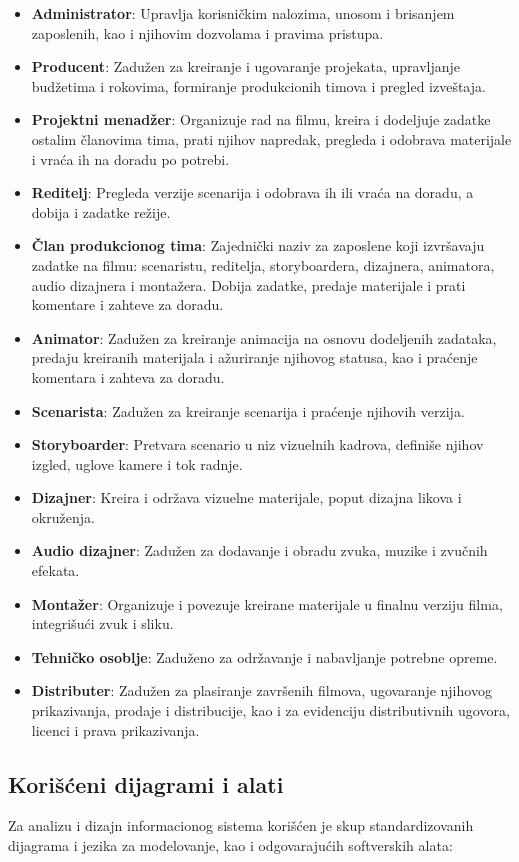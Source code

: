 \begin{itemize}
	\item \textbf{Administrator}: Upravlja korisničkim nalozima, unosom i brisanjem zaposlenih, kao i njihovim dozvolama i pravima pristupa.
	\item \textbf{Producent}: Zadužen za kreiranje i ugovaranje projekata, upravljanje budžetima i rokovima, formiranje produkcionih timova i pregled izveštaja.
	\item \textbf{Projektni menadžer}: Organizuje rad na filmu, kreira i dodeljuje zadatke ostalim članovima tima, prati njihov napredak, pregleda i odobrava materijale i vraća ih na doradu po potrebi.
	\item \textbf{Reditelj}: Pregleda verzije scenarija i odobrava ih ili vraća na doradu, a dobija i zadatke režije.
	\item \textbf{Član produkcionog tima}: Zajednički naziv za zaposlene koji izvršavaju zadatke na filmu: scenaristu, reditelja, storyboardera, dizajnera, animatora, audio dizajnera i montažera. Dobija zadatke, predaje materijale i prati komentare i zahteve za doradu.
	\item \textbf{Animator}: Zadužen za kreiranje animacija na osnovu dodeljenih zadataka, predaju kreiranih materijala i ažuriranje njihovog statusa, kao i praćenje komentara i zahteva za doradu.
	\item \textbf{Scenarista}: Zadužen za kreiranje scenarija i praćenje njihovih verzija.
	\item \textbf{Storyboarder}: Pretvara scenario u niz vizuelnih kadrova, definiše njihov izgled, uglove kamere i tok radnje.
	\item \textbf{Dizajner}: Kreira i održava vizuelne materijale, poput dizajna likova i okruženja.
	\item \textbf{Audio dizajner}: Zadužen za dodavanje i obradu zvuka, muzike i zvučnih efekata.
	\item \textbf{Montažer}: Organizuje i povezuje kreirane materijale u finalnu verziju filma, integrišući zvuk i sliku.
	\item \textbf{Tehničko osoblje}: Zaduženo za održavanje i nabavljanje potrebne opreme.
	\item \textbf{Distributer}: Zadužen za plasiranje završenih filmova, ugovaranje njihovog prikazivanja, prodaje i distribucije, kao i za evidenciju distributivnih ugovora, licenci i prava prikazivanja.
\end{itemize}

\subsection{Korišćeni dijagrami i alati}
Za analizu i dizajn informacionog sistema korišćen je skup standardizovanih dijagrama i jezika za modelovanje, kao i odgovarajućih softverskih alata:


